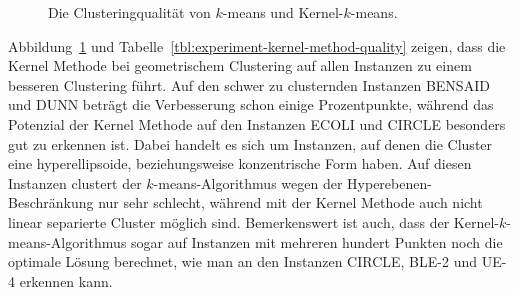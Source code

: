 \begin{figure}[h!]
	\centering
\caption{Die Clusteringqualität von $k$-means und Kernel-$k$-means.}
\label{fig:experiment-kernel-method-quality}
\end{figure}
Abbildung~\ref{fig:experiment-kernel-method-quality} und Tabelle~\ref{tbl:experiment-kernel-method-quality} zeigen, dass
die Kernel Methode bei geometrischem Clustering auf allen Instanzen zu einem besseren Clustering führt. Auf den schwer zu
clusternden Instanzen BENSAID und DUNN beträgt die Verbesserung schon einige Prozentpunkte, während das Potenzial der Kernel
Methode auf den Instanzen ECOLI und CIRCLE besonders gut zu erkennen ist. Dabei handelt es sich um Instanzen, auf denen die Cluster
eine hyperellipsoide, beziehungsweise konzentrische Form haben. Auf diesen Instanzen clustert der $k$-means-Algorithmus wegen der
Hyperebenen-Beschränkung nur sehr schlecht, während mit der Kernel Methode auch nicht linear separierte Cluster möglich sind.
Bemerkenswert ist auch, dass der Kernel-$k$-means-Algorithmus sogar auf Instanzen mit mehreren hundert Punkten noch die optimale
Lösung berechnet, wie man an den Instanzen CIRCLE, BLE-2 und UE-4 erkennen kann.
